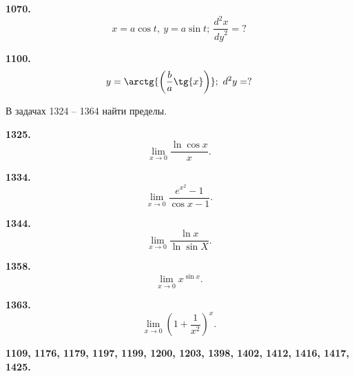 \documentclass[a4paper,10pt]{article}
\newcommand{\exercize}[1]{\textbf{#1.}}
\begin{document}
\exercize{1070} \[ x = a \cos{t},\ y = a \sin{t};\ \frac{d^2 x}{{dy}^2} = ? \]

\exercize{1100} \[ y = \arctg{\left(\frac{b}{a} \tg{x}\right)};\ d^2 y = ? \]

В задачах 1324 -- 1364 найти пределы.

\exercize{1325} \[ \lim_{x \rightarrow 0} {\frac{\ln{\cos{x}}}{x}}. \]

\exercize{1334} \[ \lim_{x \rightarrow 0} {\frac{e^{x^2} - 1}{\cos{x} - 1}}. \]

\exercize{1344} \[ \lim_{x \rightarrow 0} {\frac{\ln{x}}{\ln{\sin{X}}}}. \]

\exercize{1358} \[ \lim_{x \rightarrow 0} {x^{\sin{x}}}. \]

\exercize{1363} \[ \lim_{x \rightarrow 0} {\left( 1 + \frac{1}{x^2} \right)^x}. \]

\exercize{1109, 1176, 1179, 1197, 1199, 1200, 1203, 1398, 1402, 1412, 1416, 1417, 1425}
\end{document}
